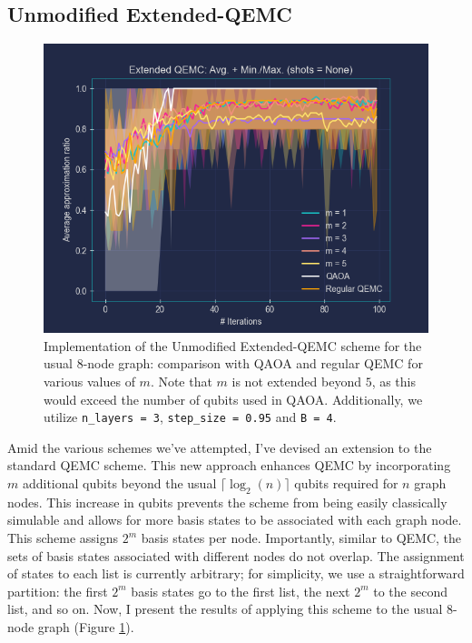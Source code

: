 \subsection{Unmodified Extended-QEMC}
\label{subsection:Vanilla_Extended_QEMC}

\begin{figure}[H]
    \centering
    \includegraphics[width=0.95\columnwidth]{Figures/Extended-QEMC/8-node(n_layers=3, step_size=0.95, m=All).png}
    \caption{Implementation of the Unmodified Extended-QEMC scheme for the usual $8$-node graph: comparison with QAOA and regular QEMC for various values of $m$. Note that $m$ is not extended beyond $5$, as this would exceed the number of qubits used in QAOA. Additionally, we utilize \texttt{n\_layers = 3}, \texttt{step\_size = 0.95} and \texttt{B = 4}.}
    \label{fig:Vanilla_Extended-QEMC}
\end{figure}

Amid the various schemes we've attempted, I've devised an extension to the standard QEMC scheme. This new approach enhances QEMC by incorporating $m$ additional qubits beyond the usual $\lceil\log_2(n)\rceil$ qubits required for $n$ graph nodes. This increase in qubits prevents the scheme from being easily classically simulable and allows for more basis states to be associated with each graph node. This scheme assigns $2^m$ basis states per node. Importantly, similar to QEMC, the sets of basis states associated with different nodes do not overlap. The assignment of states to each list is currently arbitrary; for simplicity, we use a straightforward partition: the first $2^m$ basis states go to the first list, the next $2^m$ to the second list, and so on. Now, I present the results of applying this scheme to the usual $8$-node graph (Figure \ref{fig:Vanilla_Extended-QEMC}).

